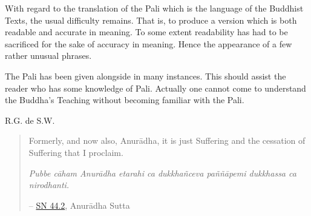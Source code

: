 With regard to the translation of the Pali which is the language of the Buddhist Texts, the usual difficulty remains. That is, to produce a version which is both readable and accurate in meaning. To some extent readability has had to be sacrificed for the sake of accuracy in meaning. Hence the appearance of a few rather unusual phrases.

The Pali has been given alongside in many instances. This should assist the reader who has some knowledge of Pali. Actually one cannot come to understand the Buddha's Teaching without becoming familiar with the Pali.

{\raggedleft
R.G. de S.W.
\par}

\vspace*{3\baselineskip}

\begin{quote}
Formerly, and now also, Anurādha, it is just Suffering and the cessation of Suffering that I proclaim.

\emph{Pubbe cāham Anurādha etarahi ca dukkhañceva paññāpemi dukkhassa ca nirodhanti.}

 -- \href{https://suttacentral.net/sn44.2/en/sujato}{SN 44.2}, Anurādha Sutta
\end{quote}
